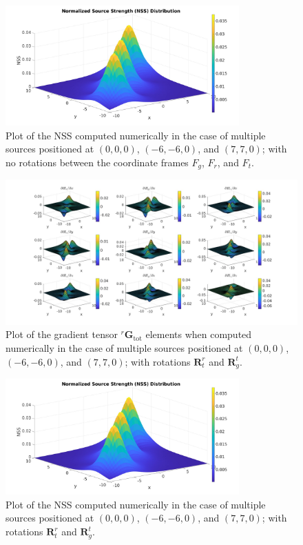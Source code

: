 \documentclass[main]{subfiles}
\begin{document}
\begin{figure}
\centering
\includegraphics[width=0.8\textwidth]{images/NSS_multi_num.jpg}
\caption{Plot of the NSS computed numerically in the case of multiple sources positioned at  $(0,0,0)$, $(-6,-6,0)$, and $(7,7,0)$; with no rotations 
between the coordinate frames \( F_g \), \( F_r \), and \( F_t \).}
\label{fig:NSS_multi_num}
\end{figure}

\begin{figure}
\hspace*{-0.2\textwidth}
\includegraphics[width=1.4\textwidth]{images/gradients_rotated_multi_num.jpg}
\caption{Plot of the gradient tensor ${}^r \mathbf{G}_{\text{tot}}$ elements
when computed numerically in the case of multiple sources positioned at  $(0,0,0)$, $(-6,-6,0)$, and $(7,7,0)$;
with rotations $\mathbf{R}^r_t$ and $\mathbf{R}_g^t$.}
\label{fig:gradients_rotated_multi_num}
\end{figure}

\begin{figure}
\centering
\includegraphics[width=0.8\textwidth]{images/NSS_rotated_multi_num.jpg}
\caption{Plot of the NSS computed numerically in the case of multiple sources positioned at  $(0,0,0)$, $(-6,-6,0)$, and $(7,7,0)$;
with rotations $\mathbf{R}^r_t$ and $\mathbf{R}_g^t$.}
\label{fig:NSS_rotated_multi_num}
\end{figure} 
\end{document}
